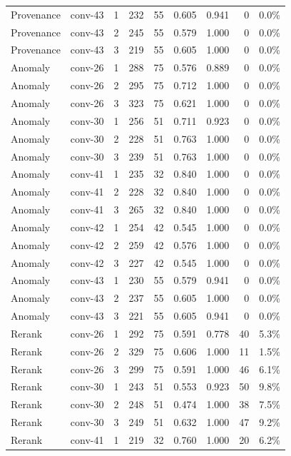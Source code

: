{\begin{longtable}{@{}l l r r r r r r r@{}}
Provenance & conv-43 & 1 & 232 & 55 & 0.605 & 0.941 & 0 & 0.0\% \\
Provenance & conv-43 & 2 & 245 & 55 & 0.579 & 1.000 & 0 & 0.0\% \\
Provenance & conv-43 & 3 & 219 & 55 & 0.605 & 1.000 & 0 & 0.0\% \\
\midrule
Anomaly & conv-26 & 1 & 288 & 75 & 0.576 & 0.889 & 0 & 0.0\% \\
Anomaly & conv-26 & 2 & 295 & 75 & 0.712 & 1.000 & 0 & 0.0\% \\
Anomaly & conv-26 & 3 & 323 & 75 & 0.621 & 1.000 & 0 & 0.0\% \\
Anomaly & conv-30 & 1 & 256 & 51 & 0.711 & 0.923 & 0 & 0.0\% \\
Anomaly & conv-30 & 2 & 228 & 51 & 0.763 & 1.000 & 0 & 0.0\% \\
Anomaly & conv-30 & 3 & 239 & 51 & 0.763 & 1.000 & 0 & 0.0\% \\
Anomaly & conv-41 & 1 & 235 & 32 & 0.840 & 1.000 & 0 & 0.0\% \\
Anomaly & conv-41 & 2 & 228 & 32 & 0.840 & 1.000 & 0 & 0.0\% \\
Anomaly & conv-41 & 3 & 265 & 32 & 0.840 & 1.000 & 0 & 0.0\% \\
Anomaly & conv-42 & 1 & 254 & 42 & 0.545 & 1.000 & 0 & 0.0\% \\
Anomaly & conv-42 & 2 & 259 & 42 & 0.576 & 1.000 & 0 & 0.0\% \\
Anomaly & conv-42 & 3 & 227 & 42 & 0.545 & 1.000 & 0 & 0.0\% \\
Anomaly & conv-43 & 1 & 230 & 55 & 0.579 & 0.941 & 0 & 0.0\% \\
Anomaly & conv-43 & 2 & 237 & 55 & 0.605 & 1.000 & 0 & 0.0\% \\
Anomaly & conv-43 & 3 & 221 & 55 & 0.605 & 0.941 & 0 & 0.0\% \\
\midrule
Rerank & conv-26 & 1 & 292 & 75 & 0.591 & 0.778 & 40 & 5.3\% \\
Rerank & conv-26 & 2 & 329 & 75 & 0.606 & 1.000 & 11 & 1.5\% \\
Rerank & conv-26 & 3 & 299 & 75 & 0.591 & 1.000 & 46 & 6.1\% \\
Rerank & conv-30 & 1 & 243 & 51 & 0.553 & 0.923 & 50 & 9.8\% \\
Rerank & conv-30 & 2 & 248 & 51 & 0.474 & 1.000 & 38 & 7.5\% \\
Rerank & conv-30 & 3 & 249 & 51 & 0.632 & 1.000 & 47 & 9.2\% \\
Rerank & conv-41 & 1 & 219 & 32 & 0.760 & 1.000 & 20 & 6.2\% \\

\end{longtable}}
